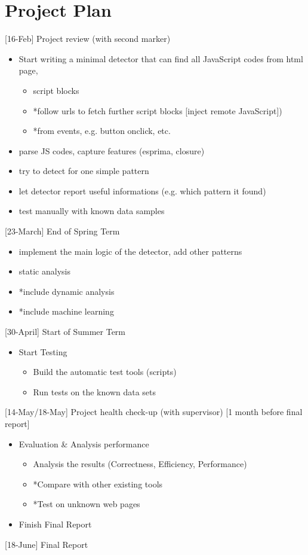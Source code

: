 \documentclass[11pt]{article}
\begin{document}
\section{Project Plan}
[16-Feb] Project review (with second marker)
\begin{itemize}
  	\item Start writing a minimal detector that can find all JavaScript codes from html page, 
  	\begin{itemize}
  		\item script blocks
  		\item *follow urls to fetch further script blocks [inject remote JavaScript])
  		\item *from events, e.g. button onclick, etc.
	\end{itemize}
	\item parse JS codes, capture features (esprima, closure)
	\item try to detect for one simple pattern
	\item let detector report useful informations (e.g. which pattern it found)
	\item test manually with known data samples
\end{itemize}
[23-March]	End of Spring Term
\begin{itemize}
	\item implement the main logic of the detector, add other patterns
	\item static analysis
	\item *include dynamic analysis
	\item *include machine learning
\end{itemize}
[30-April]	Start of Summer Term
\begin{itemize}
	\item Start Testing
		\begin{itemize}
  		\item Build the automatic test tools (scripts)
  		\item Run tests on the known data sets
	\end{itemize}
\end{itemize}
[14-May/18-May]	Project health check-up (with supervisor) [1 month before final report]
\begin{itemize}
	\item Evaluation \& Analysis performance
	\begin{itemize}
  		\item Analysis the results (Correctness, Efficiency, Performance)
  		\item *Compare with other existing tools
  		\item *Test on unknown web pages
	\end{itemize}
	\item Finish Final Report
\end{itemize}
[18-June]	Final Report
\newpage
\end{document}
